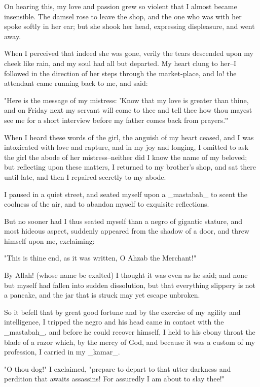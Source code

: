On hearing this, my love and passion grew so violent that I almost
became insensible. The damsel rose to leave the shop, and the one who
was with her spoke softly in her ear; but she shook her head,
expressing displeasure, and went away.

When I perceived that indeed she was gone, verily the tears descended
upon my cheek like rain, and my soul had all but departed. My heart
clung to her--I followed in the direction of her steps through the
market-place, and lo! the attendant came running back to me, and said:

"Here is the message of my mistress: 'Know that my love is greater
than thine, and on Friday next my servant will come to thee and tell
thee how thou mayest see me for a short interview before my father
comes back from prayers.'"

When I heard these words of the girl, the anguish of my heart ceased,
and I was intoxicated with love and rapture, and in my joy and
longing, I omitted to ask the girl the abode of her mistress--neither
did I know the name of my beloved; but reflecting upon these matters,
I returned to my brother's shop, and sat there until late, and then I
repaired secretly to my abode.

I paused in a quiet street, and seated myself upon a _mastabah_ to
scent the coolness of the air, and to abandon myself to exquisite
reflections.

But no sooner had I thus seated myself than a negro of gigantic
stature, and most hideous aspect, suddenly appeared from the shadow
of a door, and threw himself upon me, exclaiming:

"This is thine end, as it was written, O Ahzab the Merchant!"

By Allah! (whose name be exalted) I thought it was even as he said;
and none but myself had fallen into sudden dissolution, but that
everything slippery is not a pancake, and the jar that is struck may
yet escape unbroken.

So it befell that by great good fortune and by the exercise of my
agility and intelligence, I tripped the negro and his head came in
contact with the _mastabah_, and before he could recover himself, I
held to his ebony throat the blade of a razor which, by the mercy of
God, and because it was a custom of my profession, I carried in my
_kamar_.

"O thou dog!" I exclaimed, "prepare to depart to that utter darkness
and perdition that awaits assassins! For assuredly I am about to slay
thee!"

